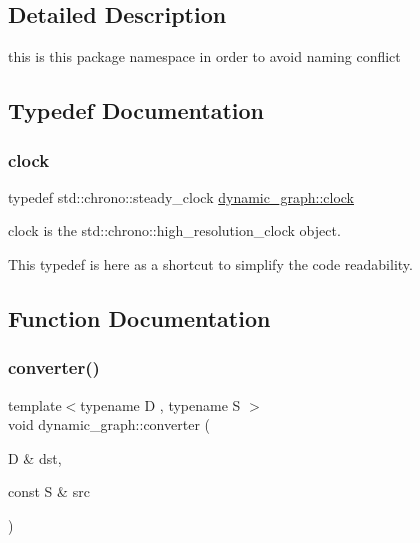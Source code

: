 \subsection{Detailed Description}
this is this package namespace in order to avoid naming conflict 

\subsection{Typedef Documentation}
\mbox{\label{namespacedynamic__graph_aca70acb5331a18e090e49b3d85290a7e}} 
\subsubsection{\texorpdfstring{clock}{clock}}
{\footnotesize\ttfamily typedef std\+::chrono\+::steady\+\_\+clock \hyperlink{namespacedynamic__graph_aca70acb5331a18e090e49b3d85290a7e}{dynamic\+\_\+graph\+::clock}}



clock is the std\+::chrono\+::high\+\_\+resolution\+\_\+clock object. 

This typedef is here as a shortcut to simplify the code readability. 

\subsection{Function Documentation}
\mbox{\label{namespacedynamic__graph_aa00932c9efb8a607efd6997386d78680}} 
\subsubsection{\texorpdfstring{converter()}{converter()}\hspace{0.1cm}{\footnotesize\ttfamily [1/2]}}
{\footnotesize\ttfamily template$<$typename D , typename S $>$ \\
void dynamic\+\_\+graph\+::converter (\begin{DoxyParamCaption}\item[{D \&}]{dst,  }\item[{const S \&}]{src }\end{DoxyParamCaption})}



